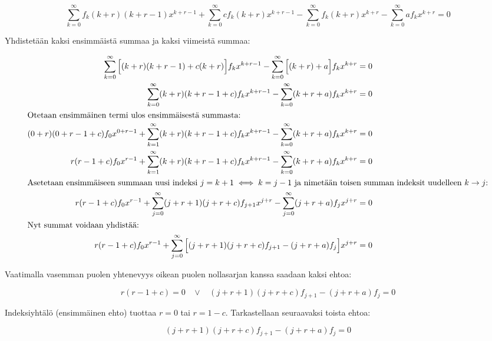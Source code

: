 \documentclass[../johdoksia.tex]{subfiles}
\begin{document}
	\begin{equation*}
		\sum_{k = 0}^{\infty}f_k(k + r)(k + r - 1)x^{k + r - 1} + \sum_{k = 0}^{\infty}cf_k(k + r)x^{k + r - 1} - \sum_{k = 0}^{\infty}f_k(k + r)x^{k + r} - \sum_{k = 0}^{\infty}af_kx^{k + r} = 0
	\end{equation*}

	\noindent Yhdistetään kaksi ensimmäistä summaa ja kaksi viimeistä summaa:
	
	\begin{align*}
		\sum_{k = 0}^{\infty}\Big[(k + r)(k + r - 1) + c(k + r)\Big]f_kx^{k + r - 1} - \sum_{k = 0}^{\infty}\Big[(k + r) + a\Big]f_kx^{k + r} &= 0 \\
		\sum_{k = 0}^{\infty}(k + r)(k + r - 1 + c)f_kx^{k + r - 1} - \sum_{k = 0}^{\infty}(k + r + a)f_kx^{k + r} &= 0 \\
		\intertext{Otetaan ensimmäinen termi ulos ensimmäisestä summasta:}
		(0 + r)(0 + r - 1 + c)f_0x^{0 + r - 1} + \sum_{k = 1}^{\infty}(k + r)(k + r - 1 + c)f_kx^{k + r - 1} - \sum_{k = 0}^{\infty}(k + r + a)f_kx^{k + r} &= 0 \\
		r(r - 1 + c)f_0x^{r - 1} + \sum_{k = 1}^{\infty}(k + r)(k + r - 1 + c)f_kx^{k + r - 1} - \sum_{k = 0}^{\infty}(k + r + a)f_kx^{k + r} &= 0 \\
		\intertext{Asetetaan ensimmäiseen summaan uusi indeksi $j = k + 1 \iff k = j - 1$ ja nimetään toisen summan indeksit uudelleen $k \to j$:}
		r(r - 1 + c)f_0x^{r - 1} + \sum_{j = 0}^{\infty}(j + r + 1)(j + r + c)f_{j + 1}x^{j + r} - \sum_{j = 0}^{\infty}(j + r + a)f_jx^{j + r} &= 0 \\
		\intertext{Nyt summat voidaan yhdistää:}
		r(r - 1 + c)f_0x^{r - 1} + \sum_{j = 0}^{\infty}\Big[(j + r + 1)(j + r + c)f_{j + 1} - (j + r + a)f_j\Big]x^{j + r} &= 0
	\end{align*}

	\noindent Vaatimalla vasemman puolen yhtenevyys oikean puolen nollasarjan kanssa saadaan kaksi ehtoa:
	
	\begin{equation*}
		r(r - 1 + c) = 0 \ \ \ \ \lor \ \ \ \ (j + r + 1)(j + r + c)f_{j + 1} - (j + r + a)f_j = 0
	\end{equation*}

	Indeksiyhtälö (ensimmäinen ehto) tuottaa $r = 0$ tai $r = 1 - c$. Tarkastellaan seuraavaksi toista ehtoa:
	
	\begin{equation*}
		(j + r + 1)(j + r + c)f_{j + 1} - (j + r + a)f_j = 0
	\end{equation*}
\end{document}
